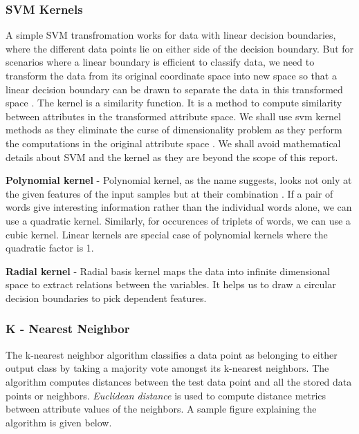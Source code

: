 \documentclass[9pt,twocolumn,twoside]{../../styles/osajnl}
\begin{document}
\subsubsection{SVM Kernels}
A simple SVM transfromation works for data with linear decision
boundaries, where the different data points lie on either side of the
decision boundary. But for scenarios where a linear boundary is
efficient to classify data, we need to transform the data from its
original coordinate space into new space so that a linear decision
boundary can be drawn to separate the data in this transformed space
\cite{book-dataminingintroduction}. The kernel is a similarity
function. It is a method to compute similarity between attributes in
the transformed attribute space. We shall use svm kernel methods as
they eliminate the curse of dimensionality problem as they perform the
computations in the original attribute space
\cite{book-dataminingintroduction}. We shall avoid mathematical
details about SVM and the kernel as they are beyond the scope of this
report.\newline

\noindent
\textbf{Polynomial kernel} - Polynomial kernel, as the name suggests, looks not
only at the given features of the input samples but at their
combination \cite{www-polykernel-wiki}. If a pair of words give
interesting information rather than the individual words alone, we can
use a quadratic kernel. Similarly, for occurences of triplets of
words, we can use a cubic kernel. Linear kernels are special case of
polynomial kernels where the quadratic factor is 1.\newline

\noindent
\textbf{Radial kernel} - Radial basis kernel maps the data into infinite
dimensional space to extract relations between the variables. It helps
us to draw a circular decision boundaries to pick dependent features.

\subsubsection{K - Nearest Neighbor}
The k-nearest neighbor algorithm classifies a data point as belonging
to either output class by taking a majority vote amongst its k-nearest
neighbors. The algorithm computes distances between the test data
point and all the stored data points or neighbors. \emph{Euclidean
  distance} \cite{www-wiki-euclidean_distance} is used to compute
distance metrics between attribute values of the neighbors. A sample
figure explaining the algorithm is given below.
\end{document}
